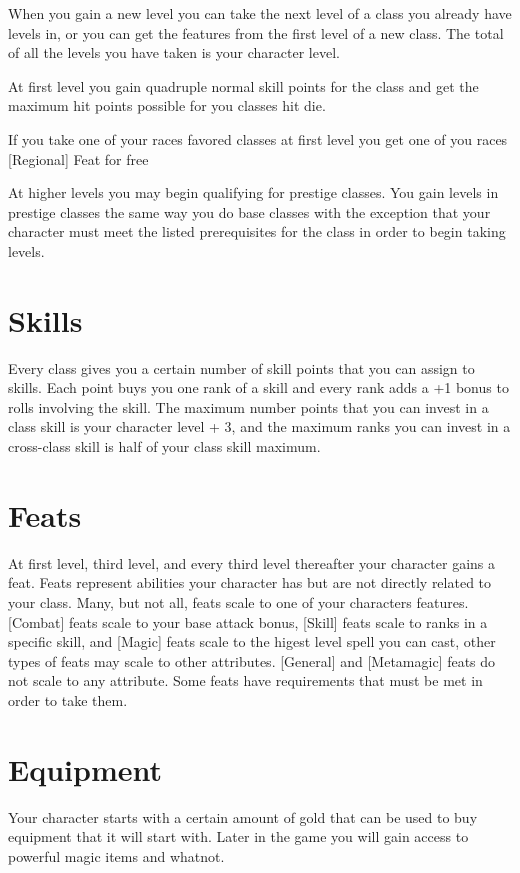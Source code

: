When you gain a new level you can take the next level of a class you already have levels in, or you can get the features from the first level of a new class.  The total of all the levels you have taken is your character level.

At first level you gain quadruple normal skill points for the class and get the maximum hit points possible for you classes hit die.

If you take one of your races favored classes at first level you get one of you races [Regional] Feat for free

At higher levels you may begin qualifying for prestige classes.  You gain levels in prestige classes the same way you do base classes with the exception that your character must meet the listed prerequisites for the class in order to begin taking levels.

\section{Skills}

Every class gives you a certain number of skill points that you can assign to skills.  Each point buys you one rank of a skill and every rank adds a +1 bonus to rolls involving the skill.  The maximum number points that you can invest in a class skill is your character level + 3, and the maximum ranks you can invest in a cross-class skill is half of your class skill maximum.

\section{Feats}

At first level, third level, and every third level thereafter your character gains a feat.  Feats represent abilities your character has but are not directly related to your class. Many, but not all, feats scale to one of your characters features. [Combat] feats scale to your base attack bonus, [Skill] feats scale to ranks in a specific skill, and [Magic] feats scale to the higest level spell you can cast, other types of feats may scale to other attributes.  [General] and [Metamagic] feats do not scale to any attribute.  Some feats have requirements that must be met in order to take them.

\section{Equipment}

Your character starts with a certain amount of gold that can be used to buy equipment that it will start with.  Later in the game you will gain access to powerful magic items and whatnot.
